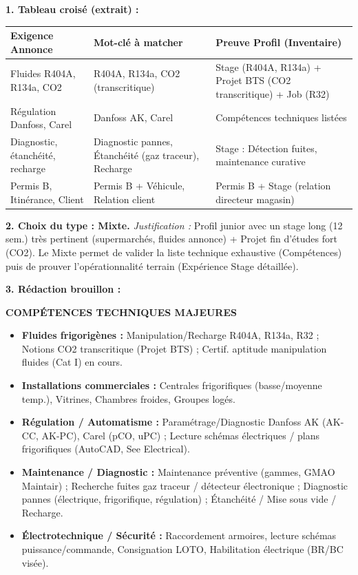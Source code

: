 \documentclass[11pt]{article}
\newcommand{\cle}[1]{{\popxbold\color{popdark}#1}}
\begin{document}
\begin{corrige}
\textbf{1. Tableau croisé (extrait) :}
\begin{center}
\begin{tabularx}{\linewidth}{|l|X|X|}\hline
\rowcolor{popblueL}
\textbf{Exigence Annonce} & \textbf{Mot-clé à matcher} & \textbf{Preuve Profil (Inventaire)} \\ \hline
Fluides R404A, R134a, CO2 & \cle{R404A, R134a, CO2 (transcritique)} & Stage (R404A, R134a) + Projet BTS (CO2 transcritique) + Job (R32) \\ \hline
Régulation Danfoss, Carel & \cle{Danfoss AK, Carel} & Compétences techniques listées \\ \hline
Diagnostic, étanchéité, recharge & \cle{Diagnostic pannes, Étanchéité (gaz traceur), Recharge} & Stage : Détection fuites, maintenance curative \\ \hline
Permis B, Itinérance, Client & \cle{Permis B + Véhicule}, \cle{Relation client} & Permis B + Stage (relation directeur magasin) \\ \hline
\end{tabularx}
\end{center}

\textbf{2. Choix du type : \textbf{Mixte}.}
\textit{Justification :} Profil junior avec un stage long (12 sem.) très pertinent (supermarchés, fluides annonce) + Projet fin d'études fort (CO2). Le Mixte permet de valider la liste technique exhaustive (Compétences) puis de prouver l'opérationnalité terrain (Expérience Stage détaillée).

\textbf{3. Rédaction brouillon :}

\textbf{COMPÉTENCES TECHNIQUES MAJEURES}
\begin{itemize}
    \item \textbf{Fluides frigorigènes :} Manipulation/Recharge \cle{R404A, R134a, R32} ; Notions \cle{CO2 transcritique} (Projet BTS) ; Certif. aptitude manipulation fluides (Cat I) en cours.
    \item \textbf{Installations commerciales :} Centrales frigorifiques (basse/moyenne temp.), Vitrines, Chambres froides, Groupes logés.
    \item \textbf{Régulation / Automatisme :} Paramétrage/Diagnostic \cle{Danfoss AK (AK-CC, AK-PC)}, \cle{Carel (pCO, uPC)} ; Lecture schémas électriques / plans frigorifiques (AutoCAD, See Electrical).
    \item \textbf{Maintenance / Diagnostic :} Maintenance préventive (gammes, GMAO \cle{Maintair}) ; Recherche fuites \cle{gaz traceur / détecteur électronique} ; Diagnostic pannes (électrique, frigorifique, régulation) ; Étanchéité / Mise sous vide / Recharge.
    \item \textbf{Électrotechnique / Sécurité :} Raccordement armoires, lecture schémas puissance/commande, Consignation LOTO, Habilitation électrique (BR/BC visée).
\end{itemize}


\end{corrige}
\end{document}
